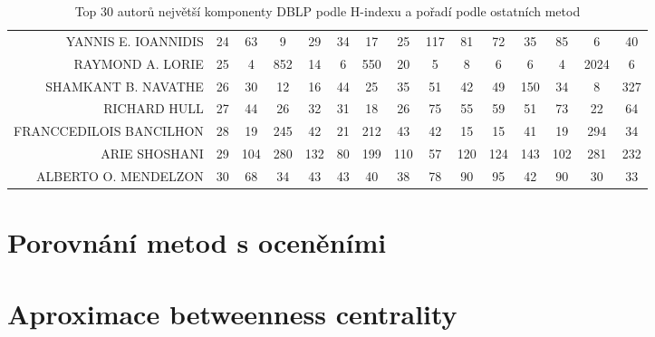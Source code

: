 \documentclass[12pt,titlepage]{report}
\begin{document}
\begin{table}[!ht]
\begin{center}
{\begin{footnotesize}
\begin{tabular}{r|cccccccccccccc}
YANNIS E. IOANNIDIS&24&63&9&29&34&17&25&117&81&72&35&85&6&40\\
RAYMOND A. LORIE&25&4&852&14&6&550&20&5&8&6&6&4&2024&6\\
SHAMKANT B. NAVATHE&26&30&12&16&44&25&35&51&42&49&150&34&8&327\\
RICHARD HULL&27&44&26&32&31&18&26&75&55&59&51&73&22&64\\
FRANCCEDILOIS BANCILHON&28&19&245&42&21&212&43&42&15&15&41&19&294&34\\
ARIE SHOSHANI&29&104&280&132&80&199&110&57&120&124&143&102&281&232\\
ALBERTO O. MENDELZON&30&68&34&43&43&40&38&78&90&95&42&90&30&33\\
\bottomrule
\end{tabular}
\end{footnotesize}
}
\end{center}
\caption{Top 30 autorů největší komponenty DBLP podle H-indexu a pořadí podle ostatních metod}
\end{table}

\section{Porovnání metod s oceněními}

\section{Aproximace betweenness centrality}
\begin{table}[!ht]
\begin{center}
\end{center}
\caption{Tabulka Spearmano koeficientů korelace mezi exaktním a aproximovaným betweenness}
\label{tab:btwA}
\end{table}
\end{document}
